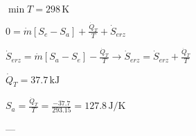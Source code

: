 \( \min T = 298 \, \text{K} \)  

\( 0 = \dot{m} [S_e - S_a] + \frac{\dot{Q}_T}{T} + \dot{S}_{erz} \)  

\( \dot{S}_{erz} = \dot{m} [S_a - S_e] - \frac{\dot{Q}_T}{T} \rightarrow \dot{S}_{erz} = \dot{S}_{erz} + \frac{\dot{Q}_T}{T} \)  

\( \dot{Q}_T = 37.7 \, \text{kJ} \)  

\( S_a = \frac{\dot{Q}_T}{T} = \frac{-37.7}{293.15} = 127.8 \, \text{J/K} \)  

---